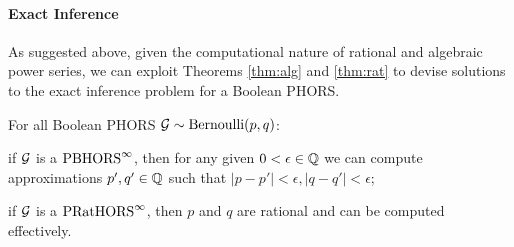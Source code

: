 \documentclass{easychair}
\begin{document}
\paragraph{Exact Inference}
As suggested above, given the computational nature of rational and algebraic power series, we can exploit Theorems 
\ref{thm:alg} and \ref{thm:rat} to devise solutions to the exact inference problem for a Boolean PHORS. 
%
% 
 \begin{theorem}
 	For all Boolean PHORS $\mathcal{G}\sim\text{Bernoulli}(p,q)$:  
 	\begin{varitemize}
	\item if $\mathcal{G}$ is a $\text{PBHORS}^{\infty}$, then for any given $0 < \epsilon \in \mathbb{Q}$ we can compute approximations $p', q'\in \mathbb{Q}$ such that $|p-p'| < \epsilon, |q-q'| < \epsilon $;
	\item if $\mathcal{G}$ is a $\text{PRatHORS}^{\infty}$, then  $p$ and $q$ are rational and can be computed effectively.
%
 	 \end{varitemize}
 \end{theorem}
\end{document}
